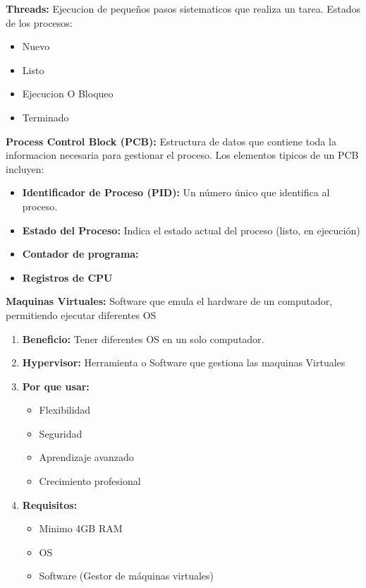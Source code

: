 \documentclass{article}
\begin{document}
    \textbf{Threads:} Ejecucion de pequeños pasos sistematicos que realiza un tarea. Estados de los procesos:
    \begin{itemize}
        \item Nuevo
        \item Listo
        \item Ejecucion O Bloqueo       
        \item Terminado
    \end{itemize}   
    \textbf{Process Control Block (PCB):} Estructura de datos que contiene toda la informacion necesaria para gestionar el proceso. Los elementos tipicos de un PCB incluyen:
    \begin{itemize}
        \item\textbf{Identificador de Proceso (PID):} Un número único que identifica al proceso.  
        \item\textbf{Estado del Proceso:} Indica el estado actual del proceso (listo, en ejecución)
        \item\textbf{Contador de programa:}
        \item\textbf{Registros de CPU}
    \end{itemize}

    \textbf{Maquinas Virtuales:} Software que emula el hardware de un computador, permitiendo ejecutar diferentes OS
    \begin{enumerate}
        \item\textbf{Beneficio:} Tener diferentes OS en un solo computador.
        \item\textbf{Hypervisor:} Herramienta o Software que gestiona las maquinas Virtuales
        \item\textbf{Por que usar:}
            \begin{itemize}
                \item Flexibilidad
                \item Seguridad
                \item Aprendizaje avanzado
                \item Crecimiento profesional
            \end{itemize}
        \item\textbf{Requisitos: }
            \begin{itemize}
                \item Minimo 4GB RAM
                \item OS
                \item Software (Gestor de máquinas virtuales)
            \end{itemize}
    \end{enumerate}
\end{document}
